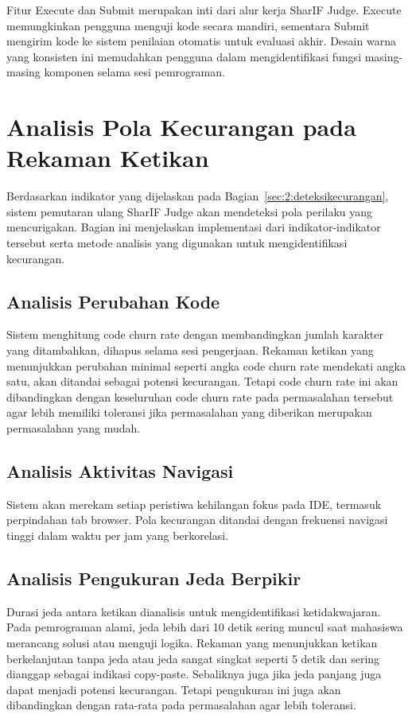 Fitur Execute dan Submit merupakan inti dari alur kerja SharIF Judge. Execute memungkinkan pengguna menguji kode secara mandiri, sementara Submit mengirim kode ke sistem penilaian otomatis untuk evaluasi akhir. Desain warna yang konsisten ini memudahkan pengguna dalam mengidentifikasi fungsi masing-masing komponen selama sesi pemrograman.

\section{Analisis Pola Kecurangan pada Rekaman Ketikan}

Berdasarkan indikator yang dijelaskan pada Bagian~\ref{sec:2:deteksikecurangan}, sistem pemutaran ulang SharIF Judge akan mendeteksi pola perilaku yang mencurigakan. Bagian ini menjelaskan implementasi dari indikator-indikator tersebut serta metode analisis yang digunakan untuk mengidentifikasi kecurangan.

\subsection{Analisis Perubahan Kode}

Sistem menghitung code churn rate dengan membandingkan jumlah karakter yang ditambahkan, dihapus selama sesi pengerjaan. Rekaman ketikan yang menunjukkan perubahan minimal seperti angka code churn rate mendekati angka satu, akan ditandai sebagai potensi kecurangan. Tetapi code churn rate ini akan dibandingkan dengan keseluruhan code churn rate pada permasalahan tersebut agar lebih memiliki toleransi jika permasalahan yang diberikan merupakan permasalahan yang mudah.

\subsection{Analisis Aktivitas Navigasi}

Sistem akan merekam setiap peristiwa kehilangan fokus pada IDE, termasuk perpindahan tab browser. Pola kecurangan ditandai dengan frekuensi navigasi tinggi dalam waktu per jam yang berkorelasi.

\subsection{Analisis Pengukuran Jeda Berpikir}

Durasi jeda antara ketikan dianalisis untuk mengidentifikasi ketidakwajaran. Pada pemrograman alami, jeda lebih dari 10 detik sering muncul saat mahasiswa merancang solusi atau menguji logika. Rekaman yang menunjukkan ketikan berkelanjutan tanpa jeda atau jeda sangat singkat seperti 5 detik dan sering dianggap sebagai indikasi copy-paste. Sebaliknya juga jika jeda panjang juga dapat menjadi potensi kecurangan. Tetapi pengukuran ini juga akan dibandingkan dengan rata-rata pada permasalahan agar lebih toleransi.

